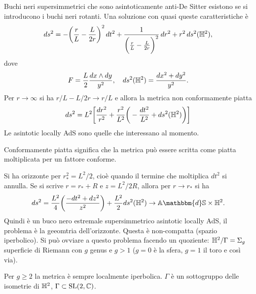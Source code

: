 Buchi neri supersimmetrici che sono asintoticamente anti-De Sitter esistono se si introducono i buchi neri rotanti. Una soluzione con quasi queste caratteristiche è 
\begin{equation}
    ds^2 = -\bigg(\frac{r}{L} - \frac{L}{2r}\bigg)^2\,dt^2 + \frac{1}{\bigg(\frac{r}{L} - \frac{L}{2r}\bigg)^2}\,dr^2 + r^2\,ds^2(\mathbb{H}^2),
\end{equation}
dove 
\begin{equation}
    F = \frac{L}{2}\frac{dx \wedge dy}{y^2},\quad ds^2(\mathbb{H}^2) = \frac{dx^2 + dy^2}{y^2}.
\end{equation}
Per $r \to \infty$ si ha $r/L - L/2r \to r/L$ e allora la metrica non conformamente piatta 
\begin{equation}
    ds^2 = L^2\bigg[\frac{dr^2}{r^2} + \frac{r^2}{L^2}\bigg(-\frac{dt^2}{L^2} + ds^2(\mathbb{H}^2)\bigg)\bigg]
\end{equation}
Le asintotic locally AdS sono quelle che interessano al momento. 
\begin{obs}
    Conformamente piatta significa che la metrica può essere scritta come piatta moltiplicata per un fattore conforme. 
\end{obs}
Si ha orizzonte per $r_*^2 = L^2/2$, cioè quando il termine che moltiplica $dt^2$ si annulla. Se si scrive $r = r_* + R$ e $z = L^2/2R$, allora per $r \to r_*$ si ha 
\begin{equation}
    ds^2 = \frac{L^2}{4}\bigg(\frac{-dt^2 + dz^2}{z^2}\bigg) + \frac{L^2}{2}ds^2(\bb{H}^2) \to \bb{A}\mathbbm{d}\bb{S} \times \bb{H}^2.
\end{equation}
Quindi è un buco nero estremale supersimmetrico asintotic locally AdS, il problema è la geeomtria dell'orizzonte. Questa è non-compatta (spazio iperbolico). Si può ovviare a questo problema facendo un quoziente: $\mathbb{H}^2/\Gamma = \Sigma_g$ superficie di Riemann con $g$ genus e $g > 1$ ($g = 0$ è la sfera, $g = 1$ il toro e così via). 
\begin{obs}
    Per $g \ge 2$ la metrica è sempre localmente iperbolica. $\Gamma$ è un sottogruppo delle isometrie di $\mathbb{H}^2$, $\Gamma \subset \mathrm{SL}(2,\mathbb{C})$.
\end{obs}